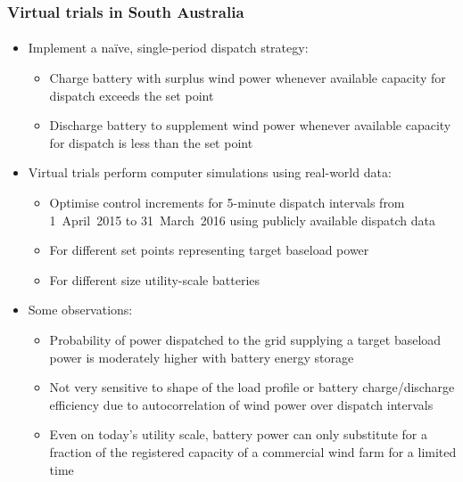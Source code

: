 \documentclass[handout, smaller, xcolor=table]{beamer}			%
\begin{document}
\begin{frame}
\begin{itemize}
	\end{itemize}

	
\end{frame}

\begin{frame}
	\frametitle{Virtual trials in South Australia}
	\framesubtitle{}

	\begin{itemize}
		\item  Implement a na\"ive, single-period dispatch strategy:
		\begin{itemize}
			\item  Charge battery with surplus wind power whenever available capacity for dispatch exceeds the set point
			\item  Discharge battery to supplement wind power whenever available capacity for dispatch is less than the set point
		\end{itemize}
		\item  Virtual trials perform computer simulations using real-world data:
		\begin{itemize}
			\item  Optimise control increments for 5-minute dispatch intervals from 1~April~2015 to 31~March~2016 using publicly available dispatch data
			\item  For different set points representing target baseload power
			\item  For different size utility-scale batteries
		\end{itemize}
		\item  Some observations:
		\begin{itemize}
			\item  Probability of power dispatched to the grid supplying a target baseload power is moderately higher with battery energy storage
			\item  Not very sensitive to shape of the load profile or battery charge/discharge efficiency due to autocorrelation of wind power over dispatch intervals
			\item  Even on today's utility scale, battery power can only substitute for a fraction of the registered capacity of a commercial wind farm for a limited time
		\end{itemize}  
		
	\end{itemize}
	
\end{frame}
\end{document}

